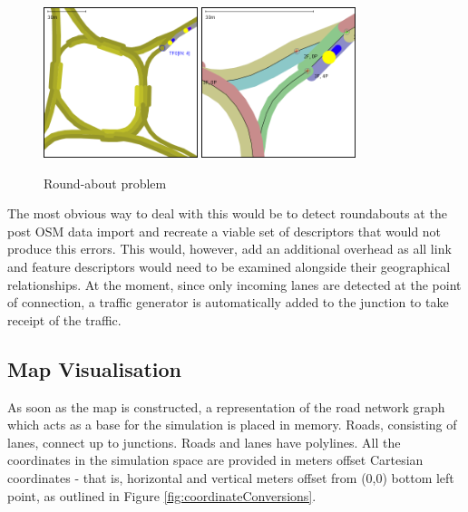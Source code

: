 \begin{figure}[!h]
	\vspace{1.5em}
  	\caption{Round-about problem}
  	\label{fig:roundAbout}
  	\centering
	\includegraphics[width=0.4\textwidth]{figs/graphConstruction/RoundAbout1.png}
	\hspace{0.2em}
	\includegraphics[width=0.40\textwidth]{figs/graphConstruction/RoundAbout2.png}
  	\vspace{1.5em}
\end{figure}

The most obvious way to deal with this would be to detect roundabouts at the post OSM data import and recreate a viable set of descriptors that would not produce this errors. This would, however, add an additional overhead as all link and feature descriptors would need to be examined alongside their geographical relationships. At the moment, since only incoming lanes are detected at the point of connection, a traffic generator is automatically added to the junction to take receipt of the traffic.

\subsection{Map Visualisation}
As soon as the map is constructed, a representation of the road network graph which acts as a base for the simulation is placed in memory. Roads, consisting of lanes, connect up to junctions. Roads and lanes have polylines. All the coordinates in the simulation space are provided in meters offset Cartesian coordinates - that is, horizontal and vertical meters offset from (0,0) bottom left point, as outlined in Figure \ref{fig:coordinateConversions}.

